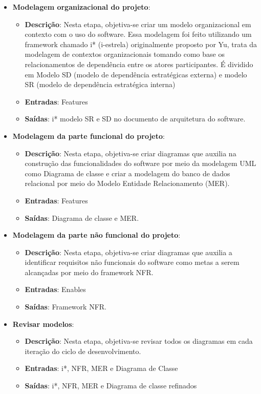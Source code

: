 \begin{itemize}
  \item \textbf{Modelagem organizacional do projeto}:
  \begin{itemize}
    \item \textbf{Descrição}: Nesta etapa, objetiva-se criar um modelo organizacional em contexto com o uso do
      software.  Essa modelagem foi feito utilizando um framework chamado i* (i-estrela) originalmente proposto
      por Yu, trata da modelagem de contextos organizacionais tomando como base os relacionamentos de dependência
      entre os atores participantes. É dividido em Modelo SD (modelo de dependência estratégicas externa) e modelo
      SR (modelo de dependência estratégica interna)
    \item \textbf{Entradas}: Features
    \item \textbf{Saídas}: i* modelo SR e SD no documento de arquitetura do software.
  \end{itemize}
  \item \textbf{Modelagem da parte funcional do projeto}:
  \begin{itemize}
    \item \textbf{Descrição}: Nesta etapa, objetiva-se criar diagramas que auxilia na construção das
      funcionalidades do software por meio da modelagem UML como Diagrama de classe e criar a modelagem do
      banco de dados relacional por meio do Modelo Entidade Relacionamento (MER).
    \item \textbf{Entradas}: Features
    \item \textbf{Saídas}: Diagrama de classe e MER.
  \end{itemize}
  \item \textbf{Modelagem da parte não funcional do projeto}:
  \begin{itemize}
    \item \textbf{Descrição}: Nesta etapa, objetiva-se criar diagramas que auxilia a identificar requisitos não
      funcionais do software como metas a serem alcançadas por meio do framework NFR.
    \item \textbf{Entradas}: Enables
    \item \textbf{Saídas}: Framework NFR.
  \end{itemize}
  \item \textbf{Revisar modelos}:
  \begin{itemize}
    \item \textbf{Descrição}: Nesta etapa, objetiva-se revisar todos os diagramas em cada iteração do ciclo
      de desenvolvimento.
    \item \textbf{Entradas}: i*, NFR, MER e Diagrama de Classe
    \item \textbf{Saídas}: i*, NFR, MER e Diagrama de classe refinados
  \end{itemize}
\end{itemize}

